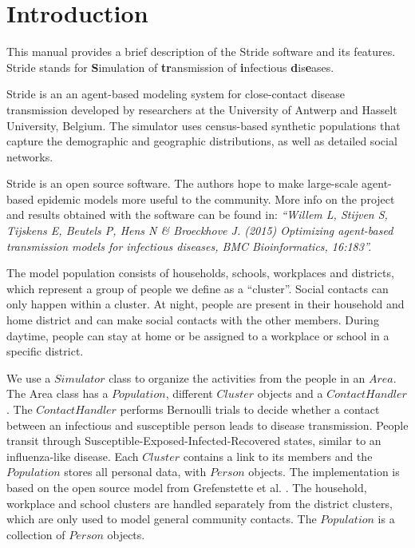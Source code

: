 \chapter{Introduction}
\label{chap:Introduction}
  
This manual provides a brief description of the Stride software and its
features. Stride stands for \textbf{S}imulation of \textbf{tr}ansmission 
 of \textbf{i}nfectious \textbf{d}is\textbf{e}ases.
 
Stride is an  an agent-based modeling 
system for close-contact
disease transmission developed by researchers at the
University of Antwerp and Hasselt University, Belgium.
The simulator uses census-based synthetic populations
that capture the demographic and geographic distributions, as well as detailed social networks.

Stride is an open source software. The authors hope to make large-scale
agent-based epidemic models more useful to the community.
More info on the project and results obtained with the software
can be found in: 
\textit{``Willem L, Stijven S, Tijskens E, Beutels P, Hens N \& Broeckhove J. (2015) Optimizing agent-based transmission models for infectious diseases, BMC Bioinformatics, 16:183''.}

The model population consists of households, schools, workplaces and
districts, which represent a group of people we define as a ``cluster''.
Social contacts can only happen within a cluster. 
At night, people are present in their household and home district and can make
social contacts with the other members.
During daytime, people can stay at home or be assigned to a workplace or school in a specific district. 


We use a $Simulator$ class to organize the activities from the people in an $Area$. 
The Area class has a $Population$, different $Cluster$ objects and a $Contact
Handler$.
The $Contact Handler$ performs Bernoulli trials to decide whether a contact
between an infectious and susceptible person leads to disease transmission. 
People transit through Susceptible-Exposed-Infected-Recovered states,
similar to an influenza-like disease.
Each $Cluster$ contains a link to its members and the $Population$ stores all personal
data, with $Person$ objects.
The implementation is based on the open source model from Grefenstette et al. \cite{grefenstette2013}. 
The household, workplace and school clusters are handled separately from the district clusters, which 
are only used to model general community contacts. The $Population$ is a collection of $Person$ objects.

